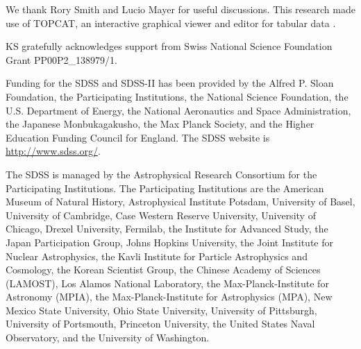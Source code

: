 \documentclass{emulateapj}
\begin{document}
We thank Rory Smith and Lucio Mayer for useful discussions. This research made use of TOPCAT, an interactive graphical viewer and editor for tabular data \citep{tay05}. 

KS gratefully acknowledges support from Swiss National Science Foundation Grant PP00P2\_138979/1.

Funding for the SDSS and SDSS-II has been provided by the Alfred P. Sloan Foundation, the Participating Institutions, the National Science Foundation, the U.S. Department of Energy, the National Aeronautics and Space Administration, the Japanese Monbukagakusho, the Max Planck Society, and the Higher Education Funding Council for England. The SDSS website is \url{http://www.sdss.org/}.

The SDSS is managed by the Astrophysical Research Consortium for the Participating Institutions. The Participating Institutions are the American Museum of Natural History, Astrophysical Institute Potsdam, University of Basel, University of Cambridge, Case Western Reserve University, University of Chicago, Drexel University, Fermilab, the Institute for Advanced Study, the Japan Participation Group, Johns Hopkins University, the Joint Institute for Nuclear Astrophysics, the Kavli Institute for Particle Astrophysics and Cosmology, the Korean Scientist Group, the Chinese Academy of Sciences (LAMOST), Los Alamos National Laboratory, the Max-Planck-Institute for Astronomy (MPIA), the Max-Planck-Institute for Astrophysics (MPA), New Mexico State University, Ohio State University, University of Pittsburgh, University of Portsmouth, Princeton University, the United States Naval Observatory, and the University of Washington.

\clearpage



\end{document}
